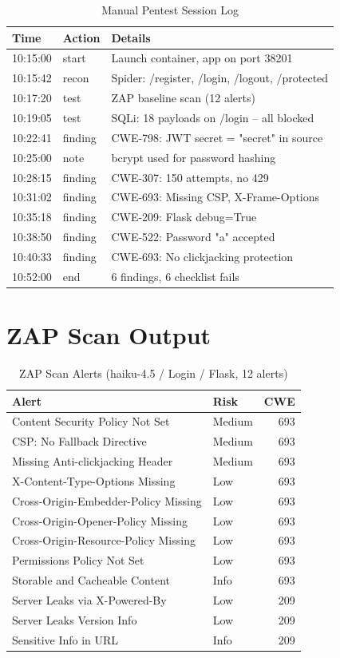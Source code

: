 \documentclass[conference,a4paper]{IEEEtran}
\begin{document}
\begin{table}[H]
\centering
\caption{Manual Pentest Session Log}
\small
\begin{tabular}{lll}
\toprule
\textbf{Time} & \textbf{Action} & \textbf{Details} \\
\midrule
10:15:00 & start & Launch container, app on port 38201 \\
10:15:42 & recon & Spider: /register, /login, /logout, /protected \\
10:17:20 & test & ZAP baseline scan (12 alerts) \\
10:19:05 & test & SQLi: 18 payloads on /login -- all blocked \\
10:22:41 & finding & CWE-798: JWT secret = "secret" in source \\
10:25:00 & note & bcrypt used for password hashing \\
10:28:15 & finding & CWE-307: 150 attempts, no 429 \\
10:31:02 & finding & CWE-693: Missing CSP, X-Frame-Options \\
10:35:18 & finding & CWE-209: Flask debug=True \\
10:38:50 & finding & CWE-522: Password "a" accepted \\
10:40:33 & finding & CWE-693: No clickjacking protection \\
10:52:00 & end & 6 findings, 6 checklist fails \\
\bottomrule
\end{tabular}
\end{table}

\section{ZAP Scan Output}

\begin{table}[H]
\centering
\caption{ZAP Scan Alerts (haiku-4.5 / Login / Flask, 12 alerts)}
\small
\begin{tabular}{llr}
\toprule
\textbf{Alert} & \textbf{Risk} & \textbf{CWE} \\
\midrule
Content Security Policy Not Set & Medium & 693 \\
CSP: No Fallback Directive & Medium & 693 \\
Missing Anti-clickjacking Header & Medium & 693 \\
X-Content-Type-Options Missing & Low & 693 \\
Cross-Origin-Embedder-Policy Missing & Low & 693 \\
Cross-Origin-Opener-Policy Missing & Low & 693 \\
Cross-Origin-Resource-Policy Missing & Low & 693 \\
Permissions Policy Not Set & Low & 693 \\
Storable and Cacheable Content & Info & 693 \\
Server Leaks via X-Powered-By & Low & 209 \\
Server Leaks Version Info & Low & 209 \\
Sensitive Info in URL & Info & 209 \\
\bottomrule
\end{tabular}
\end{table}
\end{document}
